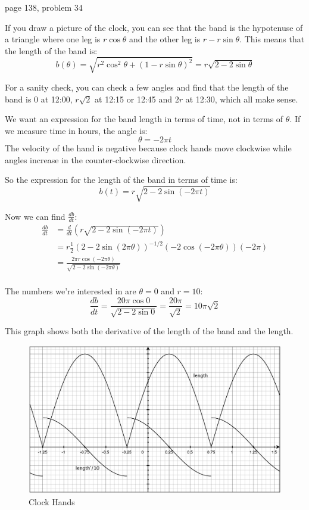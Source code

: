 \documentclass{exam}
\begin{document}
\begin{itemize*}
\item page 138, problem 34
\begin{solution}
If you draw a picture of the clock, you can see that the band is the hypotenuse of a triangle where one leg is 
$r \cos \theta$ and the other leg is $r - r \sin \theta$.  This means that the length of the band is:
\[
  b(\theta) = \sqrt{r^2 \cos^2 \theta + (1 - r \sin \theta)^2} = r \sqrt{2 - 2 \sin \theta}
\]

For a sanity check, you can check a few angles and find that the length of the band is 0 at 12:00, $r \sqrt{2}$ at 12:15
or 12:45 and $2r$ at 12:30, which all make sense.

We want an expression for the band length in terms of time, not in terms of $\theta$.  If we measure time in hours, the
angle is:
\[
  \theta = -2 \pi t
\]
The velocity of the hand is negative because clock hands move clockwise while angles increase in the counter-clockwise
direction.

So the expression for the length of the band in terms of time is:
\[
  b(t) = r \sqrt{2 - 2 \sin(- 2 \pi t) }
\]

Now we can find $\frac{db}{dt}$:
\begin{align*}
  \frac{db}{dt} &= \frac{d}{dt} (r \sqrt{2 - 2 \sin(-2 \pi t)}) \\
  &= r \frac{1}{2} (2 - 2 \sin (2 \pi \theta))^{-1/2} (-2 \cos (- 2 \pi \theta)) (-2 \pi) \\
  &= \frac{2 \pi r \cos (- 2 \pi \theta)}{\sqrt{2 - 2 \sin(- 2 \pi \theta)}} \\
\end{align*}

The numbers we're interested in are $\theta = 0$ and $r = 10$:
\[
  \frac{db}{dt} = \frac{20 \pi \cos 0}{\sqrt{2 - 2 \sin 0}} = \frac{20 \pi}{\sqrt{2}} = 10 \pi \sqrt{2} 
\]

This graph shows both the derivative of the length of the band and the length.

\begin{figure}[H]
  \centering
  \includegraphics[scale=.3]{extra_credit_34.eps}
  \caption*{Clock Hands}
\end{figure}


\end{solution}
\end{itemize*}
\end{document}
